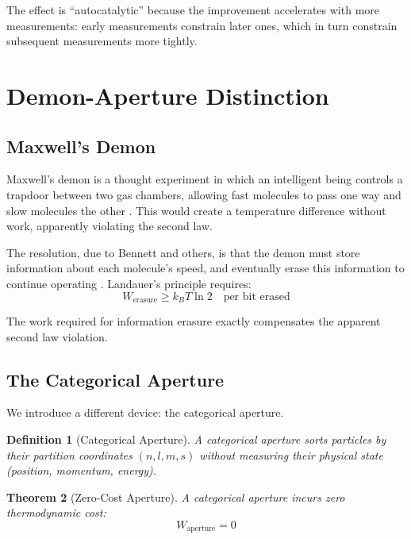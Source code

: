 \documentclass[twocolumn,10pt]{article}
\newtheorem{theorem}{Theorem}[section]
\newtheorem{definition}[theorem]{Definition}
\begin{document}
The effect is ``autocatalytic'' because the improvement accelerates with more measurements: early measurements constrain later ones, which in turn constrain subsequent measurements more tightly.

\section{Demon-Aperture Distinction}
\label{sec:demon}

\subsection{Maxwell's Demon}

Maxwell's demon is a thought experiment in which an intelligent being controls a trapdoor between two gas chambers, allowing fast molecules to pass one way and slow molecules the other \cite{maxwell1871}. This would create a temperature difference without work, apparently violating the second law.

The resolution, due to Bennett and others, is that the demon must store information about each molecule's speed, and eventually erase this information to continue operating \cite{bennett1982}. Landauer's principle requires:
\begin{equation}
    W_{\text{erasure}} \geq k_B T \ln 2 \quad \text{per bit erased}
\end{equation}

The work required for information erasure exactly compensates the apparent second law violation.

\subsection{The Categorical Aperture}

We introduce a different device: the categorical aperture.

\begin{definition}[Categorical Aperture]
A categorical aperture sorts particles by their partition coordinates $(n, l, m, s)$ without measuring their physical state (position, momentum, energy).
\end{definition}

\begin{theorem}[Zero-Cost Aperture]
\label{thm:aperture}
A categorical aperture incurs zero thermodynamic cost:
\begin{equation}
    W_{\text{aperture}} = 0
\end{equation}
\end{theorem}
\end{document}
